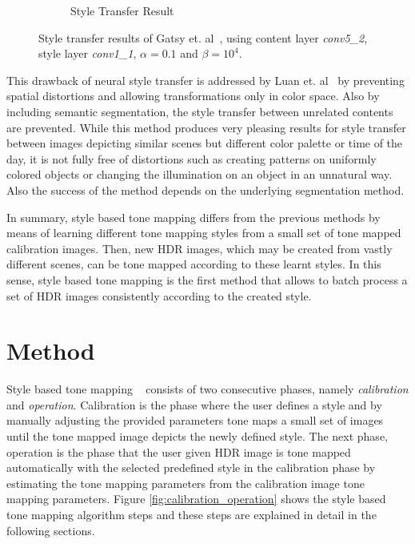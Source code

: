 {\begin{landscape}
\begin{figure}
\begin{subfigure}[b]{0.53\textwidth}
    \caption{Style Transfer Result}
    \label{fig:neuro_style_result_2}
\end{subfigure}\hfill
\caption{Style transfer results of Gatsy et. al~\cite{gatys2016image}, using content layer \emph{conv5\_2}, style layer \emph{conv1\_1}, $\alpha = 0.1$ and $\beta = 10^4$.}
\label{fig:neural_style_transfer}
\end{figure}
\end{landscape}}

This drawback of neural style transfer is addressed by Luan et. al~\cite{luan2017deep} by preventing spatial distortions and allowing transformations only in color space. Also by including semantic segmentation, the style transfer between unrelated contents are prevented. While this method produces very pleasing results for style transfer between images depicting similar scenes but different color palette or time of the day, it is not fully free of distortions such as creating patterns on uniformly colored objects or changing the illumination on an object in an unnatural way. Also the success of the method depends on the underlying segmentation method.  

In summary, style based tone mapping differs from the previous methods by means of learning different tone mapping styles from a small set of tone mapped calibration images. Then, new HDR images, which may be created from vastly different scenes, can be tone mapped according to these learnt styles. In this sense, style based tone mapping is the first method that allows to batch process a set of HDR images consistently according to the created style.

\section{Method}
Style based tone mapping ~\cite{akyuz2013style} consists of two consecutive phases, namely \emph{calibration} and \emph{operation}. Calibration is the phase where the user defines a style and by manually adjusting the provided parameters tone maps a small set of images until the tone mapped image depicts the newly defined style. The next phase, operation is the phase that the user given HDR image is tone mapped automatically with the selected predefined style in the calibration phase by estimating the tone mapping parameters from the calibration image tone mapping parameters. Figure \ref{fig:calibration_operation} shows the style based tone mapping algorithm steps and these steps are explained in detail in the following sections.

